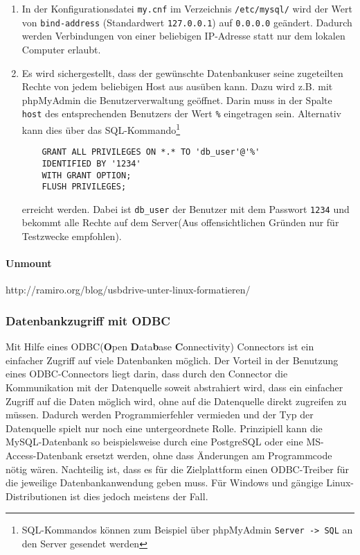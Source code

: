\begin{enumerate}
	\item In der Konfigurationsdatei \texttt{my.cnf} im Verzeichnis \texttt{/etc/mysql/} wird der Wert von \texttt{bind-address} (Standardwert \texttt{127.0.0.1}) auf \texttt{0.0.0.0} geändert. Dadurch werden Verbindungen von einer beliebigen IP-Adresse statt nur dem lokalen Computer erlaubt.
	\item Es wird sichergestellt, dass der gewünschte Datenbankuser seine zugeteilten Rechte von jedem beliebigen Host aus ausüben kann. Dazu wird z.B. mit phpMyAdmin die Benutzerverwaltung geöffnet. Darin muss in der Spalte \texttt{host} des entsprechenden Benutzers der Wert \texttt{\%} eingetragen sein. Alternativ kann dies über das SQL-Kommando\footnote{SQL-Kommandos können zum Beispiel über phpMyAdmin \texttt{Server -> SQL} an den Server gesendet werden}
	\begin{verbatim}
	GRANT ALL PRIVILEGES ON *.* TO 'db_user'@'%'
	IDENTIFIED BY '1234'
	WITH GRANT OPTION;
	FLUSH PRIVILEGES;
	\end{verbatim}
	erreicht werden. Dabei ist \texttt{db\_user} der Benutzer mit dem Passwort \texttt{1234} und bekommt alle Rechte auf dem Server(Aus offensichtlichen Gründen nur für Testzwecke empfohlen).
\end{enumerate}


\paragraph{Unmount}
http://ramiro.org/blog/usbdrive-unter-linux-formatieren/


\subsubsection{Datenbankzugriff mit ODBC}
Mit Hilfe eines ODBC(\textbf{O}pen \textbf{D}ata\textbf{b}ase \textbf{C}onnectivity) Connectors ist ein einfacher Zugriff auf viele Datenbanken möglich. Der Vorteil in der Benutzung eines ODBC-Connectors liegt darin, dass durch den Connector die Kommunikation mit der Datenquelle soweit abstrahiert wird, dass ein einfacher Zugriff auf die Daten möglich wird, ohne auf die Datenquelle direkt zugreifen zu müssen. Dadurch werden Programmierfehler vermieden und der Typ der Datenquelle spielt nur noch eine untergeordnete Rolle. Prinzipiell kann die MySQL-Datenbank so beispielsweise durch eine PostgreSQL oder eine MS-Access-Datenbank ersetzt werden, ohne dass Änderungen am Programmcode nötig wären.
Nachteilig ist, dass es für die Zielplattform einen ODBC-Treiber für die jeweilige Datenbankanwendung geben muss. Für Windows und gängige Linux-Distributionen ist dies jedoch meistens der Fall.

